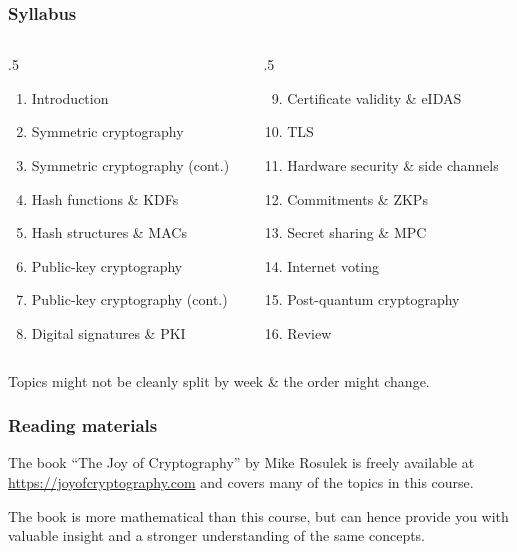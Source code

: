 \begin{frame}
  \frametitle{Syllabus}

  \begin{columns}[t]
    \begin{column}{.5\textwidth}
      \begin{enumerate}
        \item Introduction
        \item Symmetric cryptography
        \item Symmetric cryptography (cont.)
        \item Hash functions \& KDFs
        \item Hash structures \& MACs
        \item Public-key cryptography
        \item Public-key cryptography (cont.)
        \item Digital signatures \& PKI
      \end{enumerate}
    \end{column}

    \begin{column}{.5\textwidth}
      \begin{enumerate}\setcounter{enumi}{8}
        \item Certificate validity \& eIDAS
        \item TLS
        \item Hardware security \& side channels
        \item Commitments \& ZKPs
        \item Secret sharing \& MPC
        \item Internet voting
        \item Post-quantum cryptography
        \item Review
      \end{enumerate}
    \end{column}
  \end{columns}

  \vspace*{2em}

  \pause
  Topics might not be cleanly split by week \& the order might change.
\end{frame}

\begin{frame}
  \frametitle{Reading materials}

  The book \enquote{The Joy of Cryptography} by Mike Rosulek is freely available at \url{https://joyofcryptography.com} and covers many of the topics in this course.

  \vspace*{1em}

  The book is more mathematical than this course, but can hence provide you with valuable insight and a stronger understanding of the same concepts. 
\end{frame}


